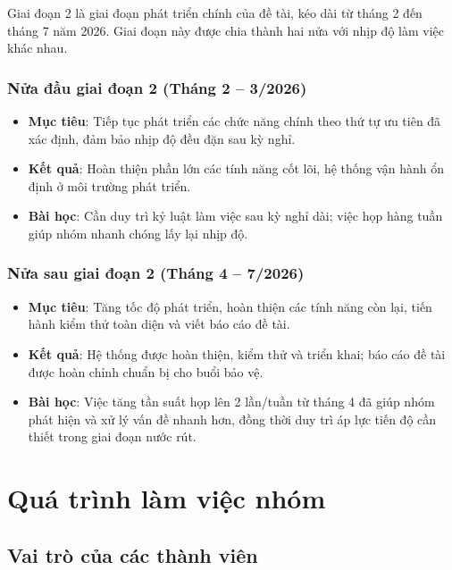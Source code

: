 Giai đoạn 2 là giai đoạn phát triển chính của đề tài, kéo dài từ tháng 2 đến tháng 7 năm 2026. Giai đoạn này được chia thành hai nửa với nhịp độ làm việc khác nhau.
 
\subsubsection*{Nửa đầu giai đoạn 2 (Tháng 2 -- 3/2026)}
 
\begin{itemize}
    \item \textbf{Mục tiêu}: Tiếp tục phát triển các chức năng chính theo thứ tự ưu tiên đã xác định, đảm bảo nhịp độ đều đặn sau kỳ nghỉ.
    \item \textbf{Kết quả}: Hoàn thiện phần lớn các tính năng cốt lõi, hệ thống vận hành ổn định ở môi trường phát triển.
    \item \textbf{Bài học}: Cần duy trì kỷ luật làm việc sau kỳ nghỉ dài; việc họp hàng tuần giúp nhóm nhanh chóng lấy lại nhịp độ.
\end{itemize}
 
\subsubsection*{Nửa sau giai đoạn 2 (Tháng 4 -- 7/2026)}
 
\begin{itemize}
    \item \textbf{Mục tiêu}: Tăng tốc độ phát triển, hoàn thiện các tính năng còn lại, tiến hành kiểm thử toàn diện và viết báo cáo đề tài.
    \item \textbf{Kết quả}: Hệ thống được hoàn thiện, kiểm thử và triển khai; báo cáo đề tài được hoàn chỉnh chuẩn bị cho buổi bảo vệ.
    \item \textbf{Bài học}: Việc tăng tần suất họp lên 2 lần/tuần từ tháng 4 đã giúp nhóm phát hiện và xử lý vấn đề nhanh hơn, đồng thời duy trì áp lực tiến độ cần thiết trong giai đoạn nước rút.
\end{itemize}
 

\section{Quá trình làm việc nhóm}
 
\subsection{Vai trò của các thành viên}
 

